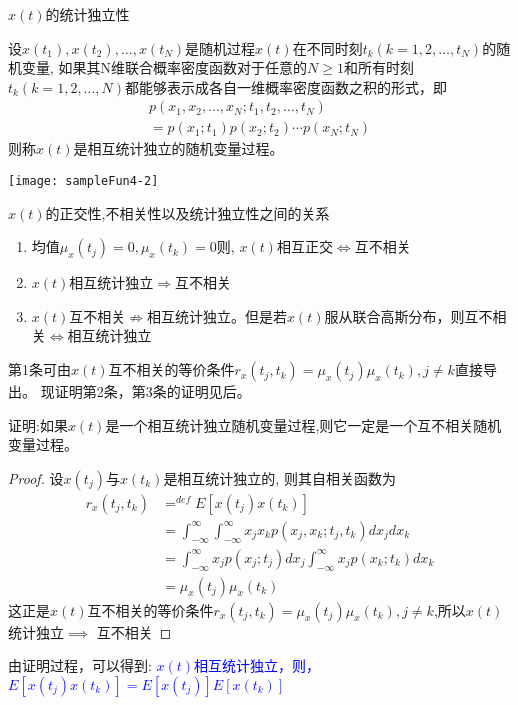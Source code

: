 \begin{frame}{$x(t)$的统计独立性}
\begin{definition}[]
设$x(t_1),x(t_2),\dots,x(t_N)$是随机过程$x(t)$在不同时刻$t_k(k=1,2,\dots,t_N)$的随机变量, 如果其N维联合概率密度函数对于任意的$N\ge 1$和所有时刻$t_k(k=1,2,\dots,N)$都能够表示成各自一维概率密度函数之积的形式，即
\begin{align*}
p(x_1,x_2,\dots,x_N; t_1,t_2,\dots,t_N)\\
=p(x_1;t_1)p(x_2;t_2)\cdots p(x_N;t_N)
\end{align*}
则称$x(t)$是相互统计独立的随机变量过程。
\end{definition}
\texttt{[image: sampleFun4-2]}
\end{frame}

\begin{frame}{$x(t)$的正交性,不相关性以及统计独立性之间的关系}
\begin{enumerate}
\item 均值$\mu_x(t_j)=0,\mu_x(t_k)=0$则, $x(t)$相互正交$\Leftrightarrow$互不相关\\
\item $x(t)$相互统计独立$\Rightarrow$互不相关
\item $x(t)$互不相关$\nRightarrow$相互统计独立。但是若$x(t)$服从联合高斯分布，则互不相关$\Leftrightarrow$相互统计独立
\end{enumerate}
第1条可由$x(t)$互不相关的等价条件$r_x(t_j,t_k)=\mu_x(t_j)\mu_x(t_k),j\ne k $直接导出。
现证明第2条，第3条的证明见后。
\end{frame}

\begin{frame}
证明:如果$x(t)$是一个相互统计独立随机变量过程,则它一定是一个互不相关随机变量过程。
\begin{proof}%
	设$x(t_j)$与$x(t_k)$是相互统计独立的, 则其自相关函数为
	\begin{align*}
	r_x(t_j,t_k)&\mathop{=}^{def}E[x(t_j)x(t_k)]\\
	&=\int_{-\infty}^{\infty}\int_{-\infty}^{\infty}x_jx_kp(x_j,x_k;t_j,t_k)dx_jdx_k\\
	&=\int_{-\infty}^{\infty}x_jp(x_j;t_j)dx_j\int_{-\infty}^{\infty}x_jp(x_k;t_k)dx_k\\
	&=\mu_x(t_j)\mu_x(t_k)
	\end{align*}
	这正是$x(t)$互不相关的等价条件$r_x(t_j,t_k)=\mu_x(t_j)\mu_x(t_k),j\ne k $,所以$x(t)$统计独立$\implies$ 互不相关
\end{proof}
由证明过程，可以得到: \textcolor{blue}{$x(t)$相互统计独立，则，$E[x(t_j)x(t_k)]=E[x(t_j)]E[x(t_k)]$}
\end{frame}

